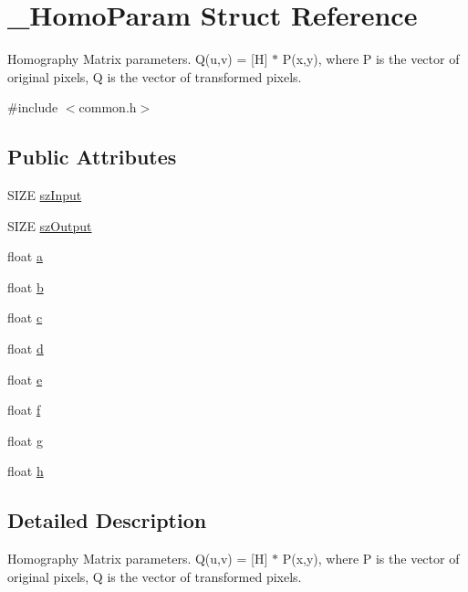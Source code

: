 \hypertarget{struct___homo_param}{}\section{\+\_\+\+Homo\+Param Struct Reference}
\label{struct___homo_param}


Homography Matrix parameters. Q(u,v) = \mbox{[}H\mbox{]} $\ast$ P(x,y), where P is the vector of original pixels, Q is the vector of transformed pixels.  




{\ttfamily \#include $<$common.\+h$>$}

\subsection*{Public Attributes}
\begin{DoxyCompactItemize}
\item 
S\+I\+ZE \mbox{\hyperlink{struct___homo_param_ad4ae576eb7ce7447d24027227f39212e}{sz\+Input}}
\item 
S\+I\+ZE \mbox{\hyperlink{struct___homo_param_a2867aab6560d4a6ed0299cb425acdd75}{sz\+Output}}
\item 
float \mbox{\hyperlink{struct___homo_param_a115e689b4a04a4c084199abd52ada276}{a}}
\item 
float \mbox{\hyperlink{struct___homo_param_a6bf6d63208b553c9b23389b4757062ba}{b}}
\item 
float \mbox{\hyperlink{struct___homo_param_a14f426f73e6461dce1be2019115601c0}{c}}
\item 
float \mbox{\hyperlink{struct___homo_param_afb50d3702e446ae39dc7fe35011049f4}{d}}
\item 
float \mbox{\hyperlink{struct___homo_param_ab88060be804013eb2a53a79aa567acac}{e}}
\item 
float \mbox{\hyperlink{struct___homo_param_ab2ae30e36db1679302959fa47316837e}{f}}
\item 
float \mbox{\hyperlink{struct___homo_param_a7707b9cdca4b270d8dfbc0c183577e2a}{g}}
\item 
float \mbox{\hyperlink{struct___homo_param_ae9b878884bff7393ef6b9653610c35c6}{h}}
\end{DoxyCompactItemize}


\subsection{Detailed Description}
Homography Matrix parameters. Q(u,v) = \mbox{[}H\mbox{]} $\ast$ P(x,y), where P is the vector of original pixels, Q is the vector of transformed pixels. 

